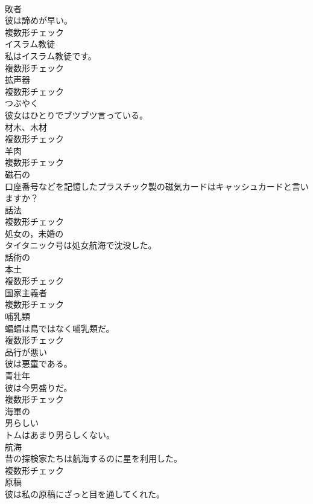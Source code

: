 \documentclass[8pt]{extreport}
\begin{document}
\begin{CJK}{UTF8}{min}
\\	[名詞]	敗者	
\\	彼は諦めが早い。	
\\	複数形チェック
\\	[名詞]	イスラム教徒	
\\	私はイスラム教徒です。	
\\	複数形チェック
\\	[名詞]	拡声器	
\\	複数形チェック
\\	[動詞]	つぶやく	
\\	彼女はひとりでブツブツ言っている。	
\\	[名詞]	材木、木材	
\\	複数形チェック
\\	[名詞]	羊肉	
\\	複数形チェック
\\	[形容詞]	磁石の	
\\	口座番号などを記憶したプラスチック製の磁気カードはキャッシュカードと言いますか？	
\\	[名詞]	話法	
\\	複数形チェック
\\	[形容詞]	処女の，未婚の	
\\	タイタニック号は処女航海で沈没した。	
\\	[形容詞]	話術の	
\\	[名詞]	本土	
\\	複数形チェック
\\	[名詞]	国家主義者	
\\	複数形チェック
\\	[名詞]	哺乳類	
\\	蝙蝠は鳥ではなく哺乳類だ。	
\\	複数形チェック
\\	[形容詞]	品行が悪い	
\\	彼は悪童である。	
\\	[名詞]	⻘壮年	
\\	彼は今男盛りだ。	
\\	複数形チェック
\\	[形容詞]	海軍の	
\\	[形容詞]	男らしい	
\\	トムはあまり男らしくない。	
\\	[名詞]	航海	
\\	昔の探検家たちは航海するのに星を利用した。	
\\	複数形チェック
\\	[名詞]	原稿	
\\	彼は私の原稿にざっと目を通してくれた。	

\end{CJK}
\end{document}
